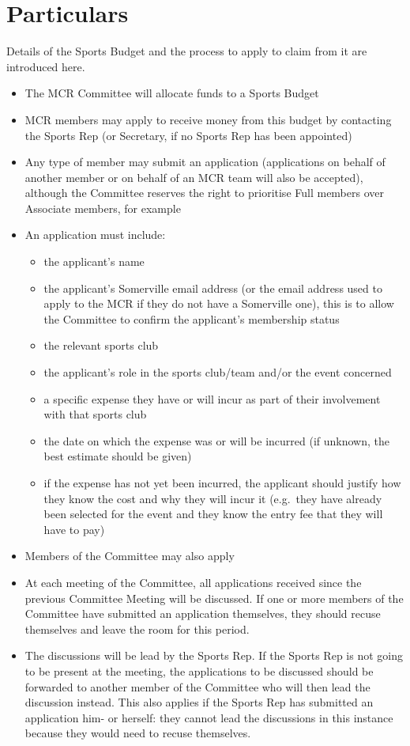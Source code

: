 \section{Particulars}
Details of the Sports Budget and the process to apply to claim from it are introduced here.
\begin{itemize}
	\item The MCR Committee will allocate funds to a Sports Budget
	\item MCR members may apply to receive money from this budget by contacting the Sports Rep (or Secretary, if no Sports Rep has been appointed)
	\item Any type of member may submit an application (applications on behalf of another member or on behalf of an MCR team will also be accepted), although the Committee reserves the right to prioritise Full members over Associate members, for example
	\item An application must include:
	\begin{itemize}
		\item the applicant's name
		\item the applicant's Somerville email address (or the email address used to apply to the MCR if they do not have a Somerville one), this is to allow the Committee to confirm the applicant's membership status
		\item the relevant sports club
		\item the applicant's role in the sports club/team and/or the event concerned
		\item a specific expense they have or will incur as part of their involvement with that sports club
		\item the date on which the expense was or will be incurred (if unknown, the best estimate should be given)
		\item if the expense has not yet been incurred, the applicant should justify how they know the cost and why they will incur it (e.g.\ they have already been selected for the event and they know the entry fee that they will have to pay)
	\end{itemize}
	\item Members of the Committee may also apply
	\item At each meeting of the Committee, all applications received since the previous Committee Meeting will be discussed. If one or more members of the Committee have submitted an application themselves, they should recuse themselves and leave the room for this period.
	\item The discussions will be lead by the Sports Rep. If the Sports Rep is not going to be present at the meeting, the applications to be discussed should be forwarded to another member of the Committee who will then lead the discussion instead. This also applies if the Sports Rep has submitted an application him- or herself: they cannot lead the discussions in this instance because they would need to recuse themselves.

\end{itemize}
